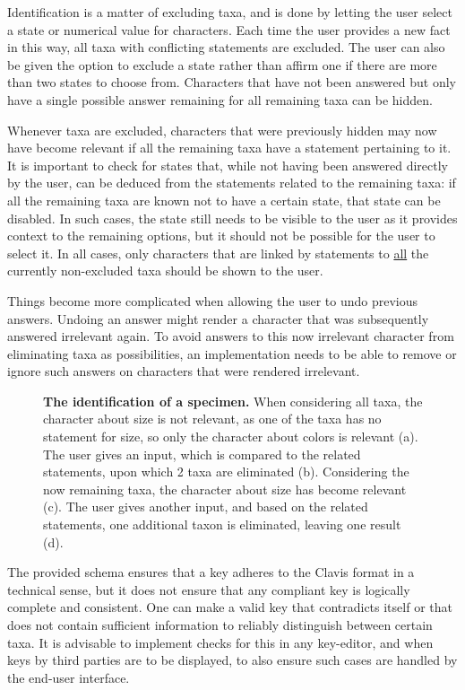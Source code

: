 \documentclass[10pt,letterpaper]{article}
\begin{document}
Identification is a matter of excluding taxa, and is done by letting the user select a state or numerical value for characters. Each time the user provides a new fact in this way, all taxa with conflicting statements are excluded. The user can also be given the option to exclude a state rather than affirm one if there are more than two states to choose from. Characters that have not been answered but only have a single possible answer remaining for all remaining taxa can be hidden.

Whenever taxa are excluded, characters that were previously hidden may now have become relevant if all the remaining taxa have a statement pertaining to it. It is important to check for states that, while not having been answered directly by the user, can be deduced from the statements related to the remaining taxa: if all the remaining taxa are known not to have a certain state, that state can be disabled. In such cases, the state still needs to be visible to the user as it provides context to the remaining options, but it should not be possible for the user to select it. In all cases, only characters that are linked by statements to \underline{all} the currently non-excluded taxa should be shown to the user.

Things become more complicated when allowing the user to undo previous answers. Undoing an answer might render a character that was subsequently answered irrelevant again. To avoid answers to this now irrelevant character from eliminating taxa as possibilities, an implementation needs to be able to remove or ignore such answers on characters that were rendered irrelevant.



\begin{figure}[!h]
  \caption{{\bf The identification of a specimen.}
  When considering all taxa, the character about size is not relevant, as one of the taxa has no statement for size, so only the character about colors is relevant (a). The user gives an input, which is compared to the related statements, upon which 2 taxa are eliminated (b). Considering the now remaining taxa, the character about size has become relevant (c). The user gives another input, and based on the related statements, one additional taxon is eliminated, leaving one result (d).
  }
  \label{fig2}
 \end{figure}

The provided schema ensures that a key adheres to the Clavis format in a technical sense, but it does not ensure that any compliant key is logically complete and consistent. One can make a valid key that contradicts itself or that does not contain sufficient information to reliably distinguish between certain taxa. It is advisable to implement checks for this in any key-editor, and when keys by third parties are to be displayed, to also ensure such cases are handled by the end-user interface.
\end{document}
